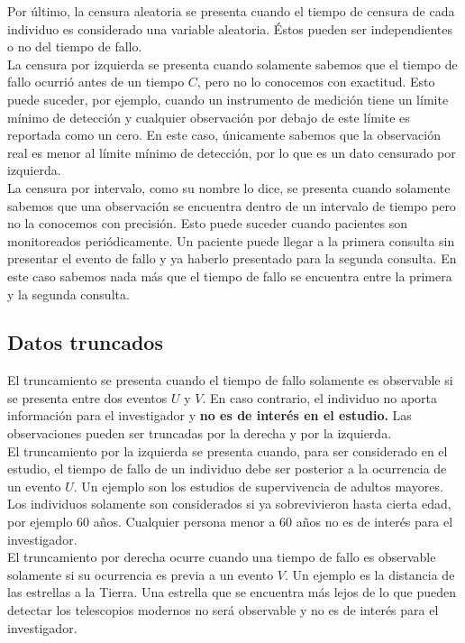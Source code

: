 \documentclass[11pt,a4paper]{article}
\begin{document}
Por último, la censura aleatoria se presenta cuando el tiempo de censura de cada individuo es considerado una variable aleatoria. Éstos pueden ser independientes o no del tiempo de fallo.\\

La censura por izquierda se presenta cuando solamente sabemos que el tiempo de fallo ocurrió antes de un tiempo $C$, pero no lo conocemos con exactitud. Esto puede suceder, por ejemplo, cuando un instrumento de medición tiene un límite mínimo de detección y cualquier observación por debajo de este límite es reportada como un cero. En este caso, únicamente sabemos que la observación real es menor al límite mínimo de detección, por lo que es un dato censurado por izquierda.\\

La censura por intervalo, como su nombre lo dice, se presenta cuando solamente sabemos que una observación se encuentra dentro de un intervalo de tiempo pero no la conocemos con precisión. Esto puede suceder cuando pacientes son monitoreados periódicamente. Un paciente puede llegar a la primera consulta sin presentar el evento de fallo y ya haberlo presentado para la segunda consulta. En este caso sabemos nada más que el tiempo de fallo se encuentra entre la primera y la segunda consulta.\\ 

\subsection{Datos truncados}
\label{sec:truncados}

El truncamiento se presenta cuando el tiempo de fallo solamente es observable si se presenta entre dos eventos $U$ y $V$. En caso contrario, el individuo no aporta información para el investigador y \textbf{no es de interés en el estudio.} Las observaciones pueden ser truncadas por la derecha y por la izquierda.\\

El truncamiento por la izquierda se presenta cuando, para ser considerado en el estudio, el tiempo de fallo de un individuo debe ser posterior  a la ocurrencia de un evento $U$. Un ejemplo son los estudios de supervivencia de adultos mayores. Los individuos solamente son considerados si ya sobrevivieron hasta cierta edad, por ejemplo 60 años. Cualquier persona menor a 60 años no es de interés para el investigador.\\

El truncamiento por derecha ocurre cuando una tiempo de fallo es observable solamente si su ocurrencia es previa a un evento $V$. Un ejemplo es la distancia de las estrellas a la Tierra. Una estrella que se encuentra más lejos de lo que pueden detectar los telescopios modernos no será observable y no es de interés para el investigador.\\
\end{document}
